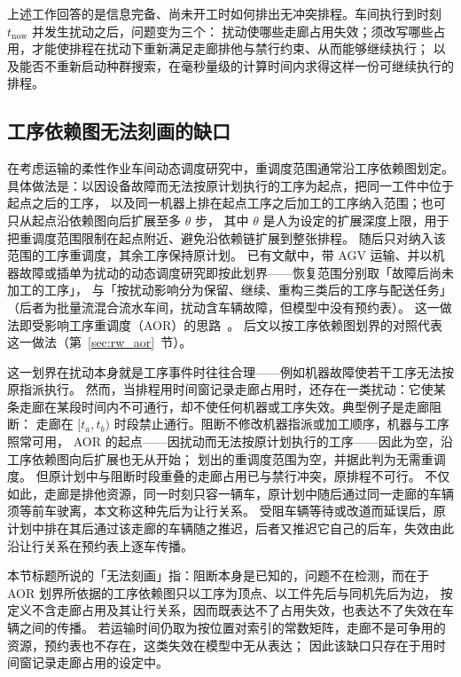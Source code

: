\documentclass[manuscript,screen,review]{acmart}
\begin{document}
上述工作回答的是信息完备、尚未开工时如何排出无冲突排程。车间执行到时刻 \(t_{\mathrm{now}}\) 并发生扰动之后，问题变为三个：
扰动使哪些走廊占用失效；须改写哪些占用，才能使排程在扰动下重新满足走廊排他与禁行约束、从而能够继续执行；
以及能否不重新启动种群搜索，在毫秒量级的计算时间内求得这样一份可继续执行的排程。

\subsection{工序依赖图无法刻画的缺口}

在考虑运输的柔性作业车间动态调度研究中，重调度范围通常沿工序依赖图划定。
具体做法是：以因设备故障而无法按原计划执行的工序为起点，把同一工件中位于起点之后的工序，
以及同一机器上排在起点工序之后加工的工序纳入范围；也可只从起点沿依赖图向后扩展至多 \(\theta\) 步，
其中 \(\theta\) 是人为设定的扩展深度上限，用于把重调度范围限制在起点附近、避免沿依赖链扩展到整张排程。
随后只对纳入该范围的工序重调度，其余工序保持原计划。
已有文献中，带 AGV 运输、并以机器故障或插单为扰动的动态调度研究即按此划界——恢复范围分别取「故障后尚未加工的工序」\cite{zhang2023energy}，
与「按扰动影响分为保留、继续、重构三类后的工序与配送任务」\cite{tang2026dynamic}（后者为批量流混合流水车间，扰动含车辆故障，但模型中没有预约表）。
这一做法即受影响工序重调度（AOR）的思路~\cite{subramaniam2003maor}。
后文以按工序依赖图划界的对照代表这一做法（第~\ref{sec:rw_aor}~节）。

这一划界在扰动本身就是工序事件时往往合理——例如机器故障使若干工序无法按原指派执行。
然而，当排程用时间窗记录走廊占用时，还存在一类扰动：它使某条走廊在某段时间内不可通行，却不使任何机器或工序失效。典型例子是走廊阻断：
走廊在 \([t_a,t_b)\) 时段禁止通行。阻断不修改机器指派或加工顺序，机器与工序照常可用，
AOR 的起点——因扰动而无法按原计划执行的工序——因此为空，沿工序依赖图向后扩展也无从开始；
划出的重调度范围为空，并据此判为无需重调度。
但原计划中与阻断时段重叠的走廊占用已与禁行冲突，原排程不可行。
不仅如此，走廊是排他资源，同一时刻只容一辆车，原计划中随后通过同一走廊的车辆须等前车驶离，本文称这种先后为让行关系。
受阻车辆等待或改道而延误后，原计划中排在其后通过该走廊的车辆随之推迟，后者又推迟它自己的后车，失效由此沿让行关系在预约表上逐车传播。

本节标题所说的「无法刻画」指：阻断本身是已知的，问题不在检测，而在于 AOR 划界所依据的工序依赖图只以工序为顶点、以工件先后与同机先后为边，
按定义不含走廊占用及其让行关系，因而既表达不了占用失效，也表达不了失效在车辆之间的传播。
若运输时间仍取为按位置对索引的常数矩阵，走廊不是可争用的资源，预约表也不存在，这类失效在模型中无从表达；
因此该缺口只存在于用时间窗记录走廊占用的设定中。
\end{document}

